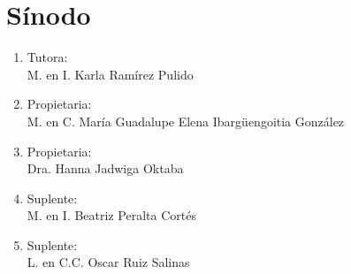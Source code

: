 \chapter*{Sínodo}
\thispagestyle{empty}
\begin{enumerate}
	\item Tutora:\\
	M. en I. Karla Ramírez Pulido
	\item Propietaria:\\
	M. en C. María Guadalupe Elena Ibargüengoitia González
	\item Propietaria:\\
	Dra. Hanna Jadwiga Oktaba
	\item Suplente:\\
	M. en I. Beatriz Peralta Cortés
	\item Suplente:\\
	L. en C.C. Oscar Ruiz Salinas
\end{enumerate}
\clearpage
\thispagestyle{empty}
